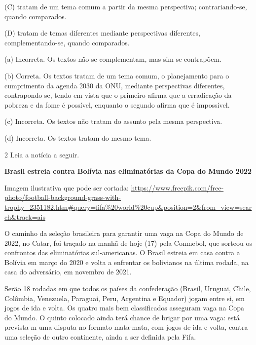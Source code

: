 \begin{itemize}
\begin{itemize}
{\begin{itemize}
\begin{itemize}
(C) tratam de um tema comum a partir da mesma perspectiva;
contrariando-se, quando comparados.

(D) tratam de temas diferentes mediante perspectivas diferentes,
complementando-se, quando comparados.


(a) Incorreta. Os textos não se complementam, mas sim se contrapõem.

(b) Correta. Os textos tratam de um tema comum, o planejamento para o
cumprimento da agenda 2030 da ONU, mediante perspectivas diferentes,
contrapondo-se, tendo em vista que o primeiro afirma que a erradicação
da pobreza e da fome é possível, enquanto o segundo afirma que é
impossível.

(c) Incorreta. Os textos não tratam do assunto pela mesma perspectiva.

(d) Incorreta. Os textos tratam do mesmo tema.

\num{2} Leia a notícia a seguir.

\textbf{Brasil estreia contra Bolívia nas eliminatórias da Copa do Mundo
2022}

Imagem ilustrativa que pode ser cortada:
\url{https://www.freepik.com/free-photo/football-background-grass-with-trophy_2351182.htm\#query=fifa\%20world\%20cup\&position=2\&from_view=search\&track=ais}

O caminho da seleção brasileira para garantir uma vaga na Copa do Mundo
de 2022, no Catar, foi traçado na manhã de hoje (17) pela Conmebol, que
sorteou os confrontos das eliminatórias sul-americanas. O Brasil estreia
em casa contra a Bolívia em março do 2020 e volta a enfrentar os
bolivianos na última rodada, na casa do adversário, em novembro de 2021.

Serão 18 rodadas em que todos os países da confederação (Brasil,
Uruguai, Chile, Colômbia, Venezuela, Paraguai, Peru, Argentina e
Equador) jogam entre si, em jogos de ida e volta. Os quatro mais bem
classificados asseguram vaga na Copa do Mundo. O quinto colocado ainda
terá chance de brigar por uma vaga: está prevista m uma disputa no
formato mata-mata, com jogos de ida e volta, contra uma seleção de outro
continente, ainda a ser definida pela Fifa.


\end{itemize}
\end{itemize}}
\end{itemize}
\end{itemize}
